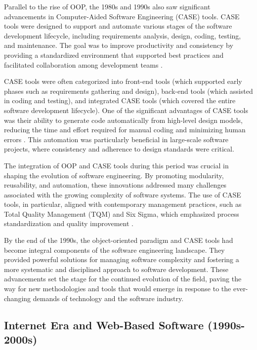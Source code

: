 \begin{refsection}
Parallel to the rise of OOP, the 1980s and 1990s also saw significant advancements in Computer-Aided Software Engineering (CASE) tools. CASE tools were designed to support and automate various stages of the software development lifecycle, including requirements analysis, design, coding, testing, and maintenance. The goal was to improve productivity and consistency by providing a standardized environment that supported best practices and facilitated collaboration among development teams \cite[pp.~101-104]{pressman2019software}.

CASE tools were often categorized into front-end tools (which supported early phases such as requirements gathering and design), back-end tools (which assisted in coding and testing), and integrated CASE tools (which covered the entire software development lifecycle). One of the significant advantages of CASE tools was their ability to generate code automatically from high-level design models, reducing the time and effort required for manual coding and minimizing human errors \cite[pp.~145-148]{ambler2004object}. This automation was particularly beneficial in large-scale software projects, where consistency and adherence to design standards were critical.

The integration of OOP and CASE tools during this period was crucial in shaping the evolution of software engineering. By promoting modularity, reusability, and automation, these innovations addressed many challenges associated with the growing complexity of software systems. The use of CASE tools, in particular, aligned with contemporary management practices, such as Total Quality Management (TQM) and Six Sigma, which emphasized process standardization and quality improvement \cite[pp.~78-81]{booch2007oop}.

By the end of the 1990s, the object-oriented paradigm and CASE tools had become integral components of the software engineering landscape. They provided powerful solutions for managing software complexity and fostering a more systematic and disciplined approach to software development. These advancements set the stage for the continued evolution of the field, paving the way for new methodologies and tools that would emerge in response to the ever-changing demands of technology and the software industry.

\subsection{Internet Era and Web-Based Software (1990s-2000s)}


\end{refsection}
